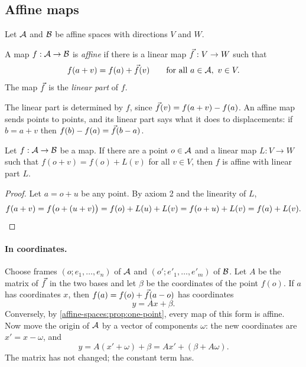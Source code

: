 \begin{notechapter}
\section{Affine maps}\label{affine-spaces:sec:maps}

Let $\mathcal{A}$ and $\mathcal{B}$ be affine spaces with directions $V$ and $W$.

\begin{definition}\label{affine-spaces:def:map}
A map $f:\mathcal{A}\to\mathcal{B}$ is \emph{affine} if there is a linear map
$\vec{f}:V\to W$ such that
\[
  f(a + v) = f(a) + \vec{f}(v)\qquad\text{for all }a\in\mathcal{A},\ v\in V .
\]
The map $\vec{f}$ is the \emph{linear part} of $f$.
\end{definition}

The linear part is determined by $f$, since
$\vec{f}(v) = f(a + v) - f(a)$. An affine map sends points to points, and
its linear part says what it does to displacements: if $b = a + v$ then
$f(b) - f(a) = \vec{f}(b - a)$.

\begin{proposition}
\label{affine-spaces:prop:one-point}
Let $f:\mathcal{A}\to\mathcal{B}$ be a map. If there are a point $o\in\mathcal{A}$ and a linear
map $L:V\to W$ such that $f(o + v) = f(o) + L(v)$ for all $v\in V$, then
$f$ is affine with linear part $L$.
\end{proposition}

\begin{proof}
Let $a = o + u$ be any point. By axiom 2 and the linearity of $L$,
\[
  f(a + v) = f\bigl(o + (u + v)\bigr) = f(o) + L(u) + L(v)
  = f(o + u) + L(v) = f(a) + L(v) .
\qedhere
\]
\end{proof}

\paragraph{In coordinates.} Choose frames $(o; e_1,\dots,e_n)$ of $\mathcal{A}$ and
$(o'; e'_1,\dots,e'_m)$ of $\mathcal{B}$. Let $A$ be the matrix of $\vec{f}$ in the
two bases and let $\beta$ be the coordinates of the point $f(o)$. If $a$
has coordinates $x$, then $f(a) = f(o) + \vec{f}(a - o)$ has coordinates
\[
  y = Ax + \beta .
\]
Conversely, by \cref{affine-spaces:prop:one-point}, every map of this form
is affine. Now move the origin of $\mathcal{A}$ by a vector of components
$\omega$: the new coordinates are $x' = x - \omega$, and
\[
  y = A(x' + \omega) + \beta = Ax' + (\beta + A\omega) .
\]
The matrix has not changed; the constant term has.


\end{notechapter}
